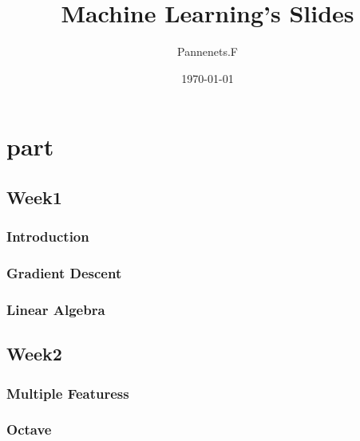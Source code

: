 \documentclass[en,11pt,english,black,simple,device=ppt]{elegantbook}
\title{Machine Learning's Slides}
\author{Pannenets.F}
\date{\today}
\begin{document}
\maketitle
\frontmatter

\tableofcontents

\mainmatter

\part{part}

\chapter{Week1}

\section{Introduction}




\section{Gradient Descent}




\section{Linear Algebra}




\chapter{Week2}

\section{Multiple Featuress}




\section{Octave}


\end{document}
